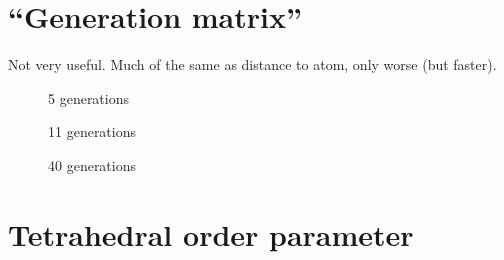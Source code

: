 \section{``Generation matrix''}
Not very useful. Much of the same as distance to atom, only worse (but faster).
%
\begin{figure}[htpb]%
    \centering%
    \caption{5 generations}%
    \label{fig:generation_matrix_r05}%
\end{figure}%
%
\begin{figure}[htpb]%
    \centering%
    \caption{11 generations}%
    \label{fig:generation_matrix_r11}%
\end{figure}%
%
\begin{figure}[htpb]%
    \centering%
    \caption{40 generations}%
    \label{fig:generation_matrix_r40}%
\end{figure}%

\FloatBarrier
\section{Tetrahedral order parameter}


